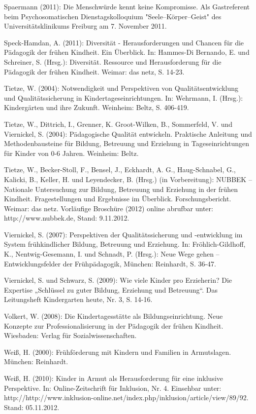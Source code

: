 Spaermann (2011): Die Menschwürde kennt keine Kompromisse. Als Gastreferent beim Psychosomatischen Dienstagskolloquium "Seele–Körper–Geist" des Universitätsklinikums Freiburg am 7. November 2011.

Speck-Hamdan, A. (2011): Diversität - Herausforderungen und Chancen für die Pädagogik der frühen Kindheit. Ein Überblick. In: Hammes-Di Bernando, E. und Schreiner, S. (Hrsg.): Diversität. Ressource und Herausforderung für die Pädagogik der frühen Kindheit. Weimar: das netz, S. 14-23.

Tietze, W. (2004): Notwendigkeit und Perspektiven von Qualitätsentwicklung und Qualitätssicherung in Kindertageseinrichtungen. In: Wehrmann, I. (Hrsg.): Kindergärten und ihre Zukunft. Weinheim: Beltz, S. 406-419.

Tietze, W., Dittrich, I., Grenner, K. Groot-Wilken, B., Sommerfeld, V. und Viernickel, S. (2004): Pädagogische Qualität entwickeln. Praktische Anleitung und Methodenbausteine für Bildung, Betreuung und Erziehung in Tageseinrichtungen für Kinder von 0-6 Jahren. Weinheim: Beltz.

Tietze, W., Becker-Stoll, F., Bensel, J., Eckhardt, A. G., Haug-Schnabel, G., Kalicki, B., Keller, H. und Leyendecker, B. (Hrsg.) (in Vorbereitung): NUBBEK -- Nationale Untersuchung zur Bildung, Betreuung und Erziehung in der frühen Kindheit.
Fragestellungen und Ergebnisse im Überblick. Forschungsbericht. Weimar: das netz. Vorläufige Broschüre (2012) online abrufbar unter: http://www.nubbek.de, Stand:  9.11.2012.

Viernickel, S. (2007): Perspektiven der Qualitätssicherung und -entwicklung im System frühkindlicher Bildung, Betreuung und Erziehung. In: Fröhlich-Gildhoff, K., Nentwig-Gesemann, I. und Schnadt, P. (Hrsg.): Neue Wege gehen -- Entwicklungsfelder der Frühpädagogik,  München: Reinhardt, S. 36-47. 

Viernickel, S. und Schwarz, S. (2009): Wie viele Kinder pro Erzieherin? Die Expertise „Schlüssel zu guter Bildung, Erziehung und Betreuung“. Das Leitungsheft Kindergarten heute, Nr. 3, S. 14-16.

Volkert, W. (2008): Die Kindertagesstätte als Bildungseinrichtung. Neue Konzepte zur Professionalisierung in der Pädagogik der frühen Kindheit. Wiesbaden: Verlag für Sozialwissenschaften.

Weiß, H. (2000): Frühförderung mit Kindern und Familien in Armutslagen. München: Reinhardt.

Weiß, H. (2010): Kinder in Armut als Herausforderung für eine inklusive Perspektive. In: Online-Zeitschrift für Inklusion, Nr. 4. Einsehbar unter: http://http://www.inklusion-online.net/index.php/inklusion/article/view/89/92. Stand: 05.11.2012.

